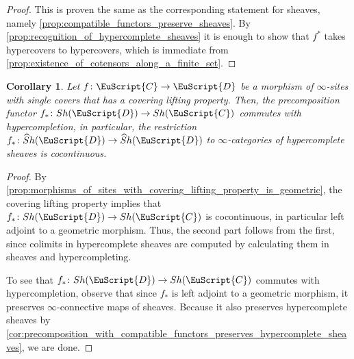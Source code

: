 \documentclass[oneside,a4paper]{amsart}
\newcommand{\euscr}[1]{\EuScript{#1}} %
\newcommand{\ccat}{\euscr{C}} %
\newcommand{\dcat}{\euscr{D}} %
\newcommand{\hpsheaves}{\widehat{S}h} %
\theoremstyle{plain}
\newtheorem{cor}[thm]{Corollary}
\theoremstyle{definition}
\theoremstyle{remark}
\begin{document}
\begin{proof}
This is proven the same as the corresponding statement for sheaves, namely \cref{prop:compatible_functors_preserve_sheaves}. By \cref{prop:recognition_of_hypercomplete_sheaves} it is enough to show that $f^{*}$ takes hypercovers to hypercovers, which is immediate from \cref{prop:existence_of_cotensors_along_a_finite_set}. 
\end{proof}

\begin{cor}
\label{cor:precomposition_with_morphism_with_covering_property_cocontinuous_on_hypercomplete_sheaves}
Let $f \colon \ccat \rightarrow \dcat$ be a morphism of $\infty$-sites with single covers that has a covering lifting property. Then, the precomposition functor $f_{*} \colon Sh(\dcat) \rightarrow Sh(\ccat)$ commutes with hypercompletion, in particular, the restriction $f_{*} \colon \hpsheaves(\dcat) \rightarrow \hpsheaves(\dcat)$ to $\infty$-categories of hypercomplete sheaves is cocontinuous.
\end{cor}

\begin{proof}
By \cref{prop:morphisms_of_sites_with_covering_lifting_property_is_geometric}, the covering lifting property implies that $f_{*} \colon Sh(\dcat) \rightarrow Sh(\ccat)$ is cocontinuous, in particular left adjoint to a geometric morphism. Thus, the second part follows from the first, since colimits in hypercomplete sheaves are computed by calculating them in sheaves and hypercompleting. 

To see that $f_{*} \colon Sh(\dcat) \rightarrow Sh(\ccat)$ commutes with hypercompletion, observe that since $f_{*}$ is left adjoint to a geometric morphism, it preserves $\infty$-connective maps of sheaves. Because it also preserves hypercomplete sheaves by \cref{cor:precomposition_with_compatible_functors_preserves_hypercomplete_sheaves}, we are done. 
\end{proof}



\end{document}
